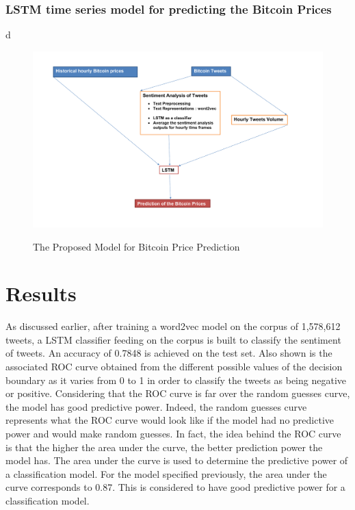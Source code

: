 \documentclass[conference]{IEEEtran}
\begin{document}
\subsubsection{LSTM time series model for predicting the Bitcoin Prices}
d
\begin{minipage}{\linewidth}
\begin{figure}[H]
\centering
\caption{The Proposed Model for Bitcoin Price Prediction} 
\includegraphics[scale=0.28]{Graphs/PlanProject.pdf}
\label{Project Plan} 
\end{figure}
\end{minipage}

\section{Results}
\par As discussed earlier, after training a word2vec model on the corpus of 1,578,612 tweets, a LSTM classifier feeding on the corpus is built to classify the sentiment of tweets. An accuracy of 0.7848 is achieved on the test set. Also shown is the associated ROC curve obtained from the different possible values of the decision boundary as it varies from 0 to 1 in order to classify the tweets as being negative or positive. Considering that the ROC curve is far over the random guesses curve, the model has good predictive power. Indeed, the random guesses curve represents what the ROC curve would look like if the model had no predictive power and would make random guesses. In fact, the idea behind the ROC curve is that the higher the area under the curve, the better prediction power the model has. The area under the curve is used to determine the predictive power of a classification model. For the model specified previously, the area under the curve corresponds to 0.87. This is considered to have good predictive power for a classification model.
\end{document}
